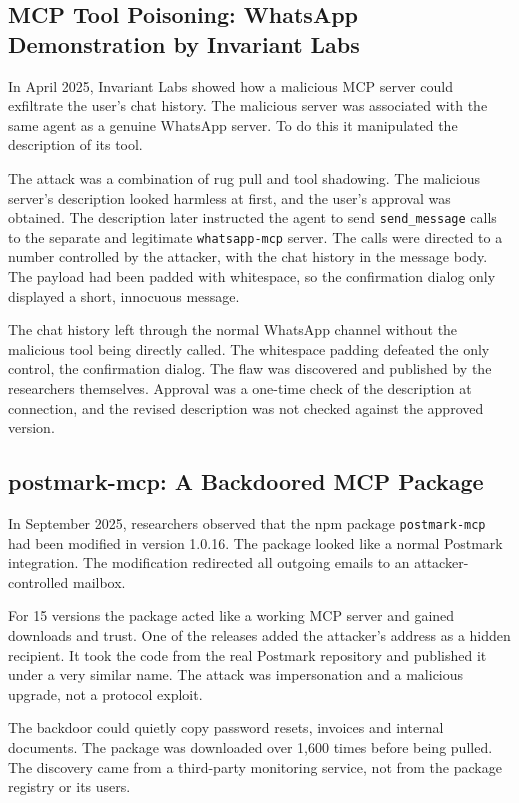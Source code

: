 \documentclass[conference]{IEEEtran}
\begin{document}
\subsection{MCP Tool Poisoning: WhatsApp Demonstration by Invariant Labs}
\label{sec:case-mcp-tool}

In April 2025, Invariant Labs showed how a malicious MCP server could exfiltrate the user's chat history. The malicious server was associated with the same agent as a genuine WhatsApp server. To do this it manipulated the description of its tool.

The attack was a combination of rug pull and tool shadowing. The malicious server's description looked harmless at first, and the user's approval was obtained. The description later instructed the agent to send \texttt{send\_message} calls to the separate and legitimate \texttt{whatsapp-mcp} server. The calls were directed to a number controlled by the attacker, with the chat history in the message body. The payload had been padded with whitespace, so the confirmation dialog only displayed a short, innocuous message.

The chat history left through the normal WhatsApp channel without the malicious tool being directly called. The whitespace padding defeated the only control, the confirmation dialog. The flaw was discovered and published by the researchers themselves. Approval was a one-time check of the description at connection, and the revised description was not checked against the approved version.

\subsection{postmark-mcp: A Backdoored MCP Package}
\label{sec:case-postmark}

In September 2025, researchers observed that the npm package \texttt{postmark-mcp} had been modified in version 1.0.16. The package looked like a normal Postmark integration. The modification redirected all outgoing emails to an attacker-controlled mailbox.

For 15 versions the package acted like a working MCP server and gained downloads and trust. One of the releases added the attacker's address as a hidden recipient. It took the code from the real Postmark repository and published it under a very similar name. The attack was impersonation and a malicious upgrade, not a protocol exploit.

The backdoor could quietly copy password resets, invoices and internal documents. The package was downloaded over 1,600 times before being pulled. The discovery came from a third-party monitoring service, not from the package registry or its users.
\end{document}
